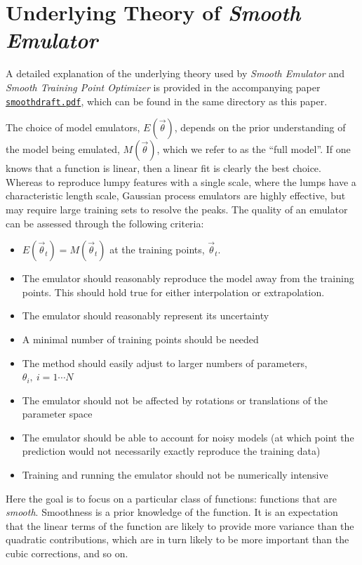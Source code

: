 \documentclass[UserManual.tex]{subfiles}
\begin{document}
\setcounter{section}{10}

\section{Underlying Theory of {\it Smooth Emulator}}\label{sec:theory}

A detailed explanation of the underlying theory used by {\it Smooth Emulator} and {\it Smooth Training Point Optimizer} is provided in the accompanying paper \href{./smoothdraft.pdf}{{\tt smoothdraft.pdf}}, which can be found in the same directory as this paper.

The choice of model emulators, $E(\vec{\theta})$, depends on the prior understanding of the model being emulated, $M(\vec{\theta})$, which we refer to as the ``full model''. If one knows that  a function is linear, then a linear fit is clearly the best choice. Whereas to reproduce lumpy features with a single scale, where the lumps have a characteristic length scale, Gaussian process emulators are highly effective, but may require large training sets to resolve the peaks. The quality of an emulator can be assessed through the following criteria:
\begin{itemize}
  \item $E(\vec{\theta}_t)=M(\vec{\theta}_t)$ at the training points, $\vec{\theta}_t$. 
  \item The emulator should reasonably reproduce the model away from the training points. This should hold true for either interpolation or extrapolation.
  \item The emulator should reasonably represent its uncertainty
  \item A minimal number of training points should be needed
  \item The method should easily adjust to larger numbers of parameters, $\theta_i,~i=1\cdots N$
  \item The emulator should not be affected by rotations or translations of the parameter space
  \item The emulator should be able to account for noisy models (at which point the prediction would not necessarily exactly reproduce the training data)
  \item Training and running the emulator should not be numerically intensive
\end{itemize}
Here the goal is to focus on a particular class of functions: functions that are {\it smooth}. Smoothness is a prior knowledge of the function. It is an expectation that the linear terms of the function are likely to provide more variance than the quadratic contributions, which are in turn likely to be more important than the cubic corrections, and so on. 
\end{document}
